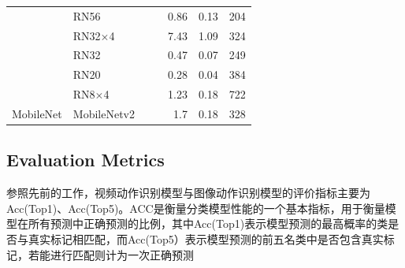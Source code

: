 \documentclass[10.5pt,letterpaper]{article}
\begin{document}
\begin{table}[ht]
{\begin{tabular}{llccrrr}
			&RN56&\checkmark               &      &0.86  &0.13  & 204 \\
			& RN32$\times$4&\checkmark     &      &7.43  &1.09  &324  \\
			& RN32&& \checkmark            &0.47  &0.07  &249  \\
			& RN20&& \checkmark            &0.28  & 0.04 &384  \\
			& RN8$\times$4 && \checkmark   &1.23  &0.18  & 722 \\
			\midrule[0.5pt]
			\multirow{1}{*}{	MobileNet\cite{sandler-cvpr2018-mobilenetv2} }  &	MobileNetv2&\checkmark   & &1.7  &0.18 &328\\
			\bottomrule
		\end{tabular}
	}
	\label{tab.model}
\end{table}
\begin{table}[!t]
\centering
\caption{Statistics of Dataset.}
\label{tbl:dataset}
\end{table}


\subsection{Evaluation Metrics}
参照先前的工作\cite{zong-iclr2023-kd}\cite{li-aaai2023-ctkd}\cite{xie-cvpr2023-dynamickd}，视频动作识别模型与图像动作识别模型的评价指标主要为Acc(Top1)、Acc(Top5)。ACC是衡量分类模型性能的一个基本指标，用于衡量模型在所有预测中正确预测的比例，其中Acc(Top1)表示模型预测的最高概率的类是否与真实标记相匹配，而Acc(Top5）表示模型预测的前五名类中是否包含真实标记，若能进行匹配则计为一次正确预测
\end{document}
